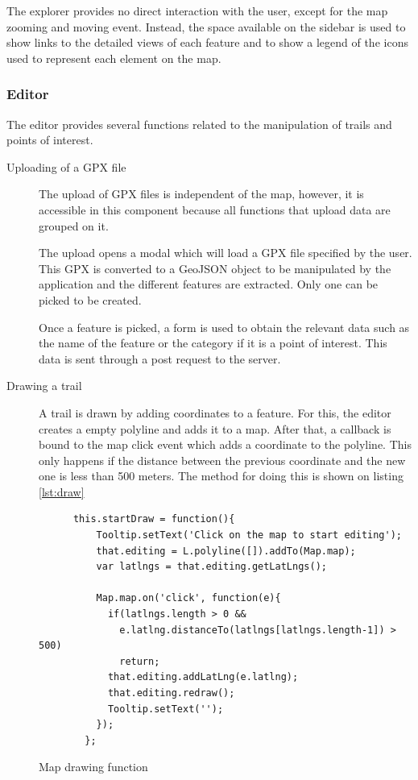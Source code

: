 The explorer provides no direct interaction with the user, except for the map zooming and moving event. Instead, the space available on the sidebar is used to show links to the detailed views of each feature and to show a legend of the icons used to represent each element on the map.

\subsubsection*{Editor}

The editor provides several functions related to the manipulation of trails and points of interest.

\begin{description}
\item[Uploading of a GPX file] The upload of GPX files is independent of the map, however, it is accessible in this component because all functions that upload data are grouped on it.

The upload opens a modal which will load a GPX file specified by the user. This GPX is converted to a GeoJSON object to be manipulated by the application and the different features are extracted. Only one can be picked to be created.

Once a feature is picked, a form is used to obtain the relevant data such as the name of the feature or the category if it is a point of interest. This data is sent through a post request to the server.

\item[Drawing a trail] A trail is drawn by adding coordinates to a feature. For this, the editor creates a empty polyline and adds it to a map. After that, a callback is bound to the map click event which adds a coordinate to the polyline. This only happens if the distance between the previous coordinate and the new one is less than 500 meters. The method for doing this is shown on listing \ref{lst:draw}

\begin{listing}[ht]\centering
  \begin{minipage}{.80\textwidth}
    \begin{verbatim}
      this.startDraw = function(){
          Tooltip.setText('Click on the map to start editing');
          that.editing = L.polyline([]).addTo(Map.map);
          var latlngs = that.editing.getLatLngs();
      
          Map.map.on('click', function(e){
            if(latlngs.length > 0 && 
              e.latlng.distanceTo(latlngs[latlngs.length-1]) > 500) 
              return;
            that.editing.addLatLng(e.latlng);
            that.editing.redraw();
            Tooltip.setText('');
          });
        };
    \end{verbatim}
  \end{minipage}
  \caption{Map drawing function}\label{lst:draw}
\end{listing}


\end{description}
